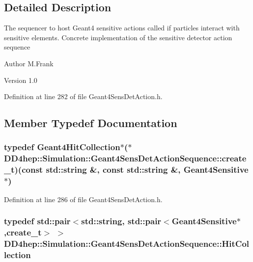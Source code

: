 \subsection{Detailed Description}
The sequencer to host Geant4 sensitive actions called if particles interact with sensitive elements. Concrete implementation of the sensitive detector action sequence

\begin{DoxyAuthor}{Author}
M.Frank 
\end{DoxyAuthor}
\begin{DoxyVersion}{Version}
1.0 
\end{DoxyVersion}


Definition at line 282 of file Geant4SensDetAction.h.

\subsection{Member Typedef Documentation}
\hypertarget{class_d_d4hep_1_1_simulation_1_1_geant4_sens_det_action_sequence_a81e56326a5a51cf3df62bfe60014b291}{
\subsubsection[{create\_\-t}]{\setlength{\rightskip}{0pt plus 5cm}typedef {\bf Geant4HitCollection}$\ast$($\ast$ {\bf DD4hep::Simulation::Geant4SensDetActionSequence::create\_\-t})(const std::string \&, const std::string \&, {\bf Geant4Sensitive} $\ast$)}}
\label{class_d_d4hep_1_1_simulation_1_1_geant4_sens_det_action_sequence_a81e56326a5a51cf3df62bfe60014b291}


Definition at line 286 of file Geant4SensDetAction.h.\hypertarget{class_d_d4hep_1_1_simulation_1_1_geant4_sens_det_action_sequence_ac2b994581eab7aad3b5473ac416f65fd}{
\subsubsection[{HitCollection}]{\setlength{\rightskip}{0pt plus 5cm}typedef std::pair$<$std::string, std::pair$<${\bf Geant4Sensitive}$\ast$,{\bf create\_\-t}$>$ $>$ {\bf DD4hep::Simulation::Geant4SensDetActionSequence::HitCollection}}}
\label{class_d_d4hep_1_1_simulation_1_1_geant4_sens_det_action_sequence_ac2b994581eab7aad3b5473ac416f65fd}


